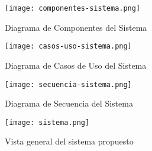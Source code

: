

\begin{figure}[H]
	\centering
	\texttt{[image: componentes-sistema.png]}
	\caption{Diagrama de Componentes del Sistema}
	\label{fig:componentes-sistema}
\end{figure}


\begin{figure}[H]
	\centering
	\texttt{[image: casos-uso-sistema.png]}
	\caption{Diagrama de Casos de Uso del Sistema}
	\label{fig:casos-uso}
\end{figure}


\begin{figure}[H]
	\centering
	\texttt{[image: secuencia-sistema.png]}
	\caption{Diagrama de Secuencia del Sistema}
	\label{fig:secuencia-sistema}
\end{figure}


\begin{figure}[H]
	\centering
	\texttt{[image: sistema.png]}
	\caption{Vista general del sistema propuesto}
	\label{fig:vista-general}
\end{figure}